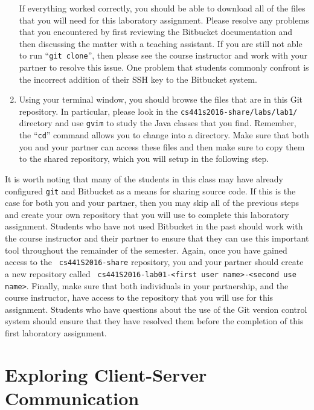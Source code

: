 \begin{enumerate}
    If everything worked correctly, you should be able to download all of the files that you will need for this
    laboratory assignment. Please resolve any problems that you encountered by first reviewing the Bitbucket
    documentation and then discussing the matter with a teaching assistant.  If you are still not able to run ``{\tt git
      clone}'', then please see the course instructor and work with your partner to resolve this issue. One problem that
      students commonly confront is the incorrect addition of their SSH key to the Bitbucket system.

  \item Using your terminal window, you should browse the files that are in this Git repository.  In particular, please
    look in the {\tt cs441s2016-share/labs/lab1/} directory and use {\tt gvim} to study the Java classes that
    you find.  Remember, the ``{\tt cd}'' command allows you to change into a directory. Make sure that both you and
    your partner can access these files and then make sure to copy them to the shared repository, which you will
    setup in the following step.

  \end{enumerate}

  It is worth noting that many of the students in this class may have already configured {\tt git} and Bitbucket as a
  means for sharing source code. If this is the case for both you and your partner, then you may skip all of the previous
  steps and create your own repository that you will use to complete this laboratory assignment. Students who have not
  used Bitbucket in the past should work with the course instructor and their partner to ensure that they can use this
  important tool throughout the remainder of the semester. Again, once you have gained access to the {\tt
    cs441S2016-share} repository, you and your partner should create a new repository called {\tt
  cs441S2016-lab01-<first user name>-<second use name>}. Finally, make sure that both individuals in your partnership, and
  the course instructor, have access to the repository that you will use for this assignment. Students who have questions
  about the use of the Git version control system should ensure that they have resolved them before the completion of this
  first laboratory assignment.

\section*{Exploring Client-Server Communication}

